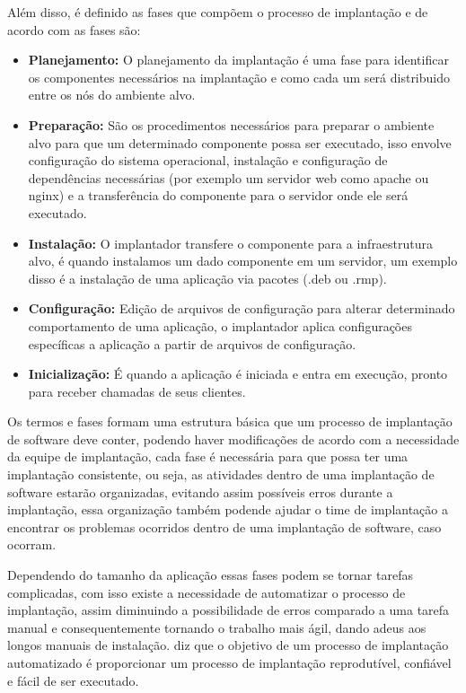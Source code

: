 Além disso, é definido as fases que compõem o processo de implantação e de acordo
com \cite{omg2006} as fases são:

\begin{itemize}
  \item  \textbf{Planejamento:} O planejamento da implantação é uma fase
  para identificar os componentes necessários na implantação e como cada um será
  distribuido entre os nós do ambiente alvo.
  \item  \textbf{Preparação:} São os procedimentos necessários para preparar o
  ambiente alvo para que um determinado componente possa ser executado, isso envolve
  configuração do sistema operacional, instalação e configuração de dependências
  necessárias (por exemplo um servidor web como apache ou nginx) e a transferência
  do componente para o servidor onde ele será executado.
  \item  \textbf{Instalação:} O implantador transfere o componente para a infraestrutura
  alvo, é quando instalamos um dado componente em um servidor, um exemplo disso
  é a instalação de uma aplicação via pacotes (.deb ou .rmp).
  \item  \textbf{Configuração:} Edição de arquivos de configuração para alterar
  determinado comportamento de uma aplicação, o implantador aplica configurações
  específicas a aplicação a partir de arquivos de configuração.
  \item  \textbf{Inicialização:} É quando a aplicação é iniciada e entra em execução,
  pronto para receber chamadas de seus clientes.
\end{itemize}

Os termos e fases formam uma estrutura básica que um processo de implantação de software
deve conter, podendo haver modificações de acordo com a necessidade da equipe de implantação,
cada fase é necessária para que possa ter uma implantação consistente, ou seja, as
atividades dentro de uma implantação de software estarão organizadas, evitando assim
possíveis erros durante a implantação, essa organização também podende ajudar o
time de implantação a encontrar os problemas ocorridos dentro de uma implantação
de software, caso ocorram.

Dependendo do tamanho da aplicação essas fases podem se tornar tarefas complicadas,
com isso existe a necessidade de automatizar o processo de implantação, assim
diminuindo a possibilidade de erros comparado a uma tarefa manual e consequentemente
tornando o trabalho mais ágil, dando adeus aos longos manuais de instalação.
\cite{humble2010} diz que o objetivo de um processo de implantação automatizado é
proporcionar um processo de implantação reprodutível, confiável e fácil de ser
executado.


